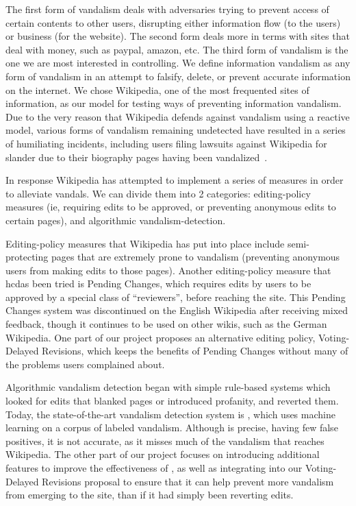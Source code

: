 The first form of vandalism deals with adversaries trying to prevent access of certain contents to other users, disrupting either information flow (to the users) or business (for the website). The second form deals more in terms with sites that deal with money, such as paypal, amazon, etc. The third form of vandalism is the one we are most interested in controlling. We define information vandalism as any form of vandalism in an attempt to falsify, delete, or prevent accurate information on the internet. We chose Wikipedia, one of the most frequented sites of information, as our model for testing ways of preventing information vandalism.
Due to the very reason that Wikipedia defends against vandalism using a reactive model, various forms of vandalism remaining undetected have resulted in a series of humiliating incidents, including users filing lawsuits against Wikipedia for slander due to their biography pages having been vandalized~\cite{golfer-sues-wikipedia-vandalism}.

In response Wikipedia has attempted to implement a series of measures in order to alleviate vandals. We can divide them into 2 categories: editing-policy measures (ie, requiring edits to be approved, or preventing anonymous edits to certain pages), and algorithmic vandalism-detection.

Editing-policy measures that Wikipedia has put into place include semi-protecting pages that are extremely prone to vandalism (preventing anonymous users from making edits to those pages). Another editing-policy measure that hcdas been tried is Pending Changes, which requires edits by users to be approved by a special class of ``reviewers'', before reaching the site. This Pending Changes system was discontinued on the English Wikipedia after receiving mixed feedback, though it continues to be used on other wikis, such as the German Wikipedia. One part of our project proposes an alternative editing policy, Voting-Delayed Revisions, which keeps the benefits of Pending Changes without many of the problems users complained about.

Algorithmic vandalism detection began with simple rule-based systems which looked for edits that blanked pages or introduced profanity, and reverted them. Today, the state-of-the-art vandalism detection system is \sys, which uses machine learning on a corpus of labeled vandalism. Although \sys is precise, having few false positives, it is not accurate, as it misses much of the vandalism that reaches Wikipedia. The other part of our project focuses on introducing additional features to improve the effectiveness of \sys, as well as integrating \sys into our Voting-Delayed Revisions proposal to ensure that it can help prevent more vandalism from emerging to the site, than if it had simply been reverting edits.

